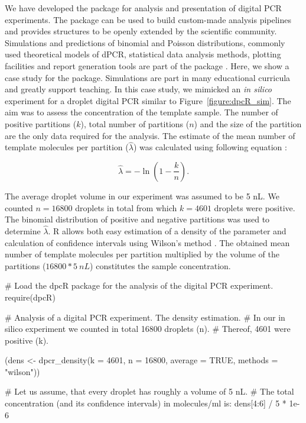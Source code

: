 We have developed the  package for analysis and presentation of 
digital PCR experiments. The  package can be used to build 
custom-made analysis pipelines and provides structures to be openly extended by 
the scientific community. Simulations and predictions of binomial and Poisson 
distributions, commonly used theoretical models of dPCR, statistical data 
analysis methods, plotting facilities and report generation tools are part of 
the package \citep{pabinger_2014}. Here, we show a case study for the 
 package. Simulations are part in many educational curricula and 
greatly support teaching. In this case study, we mimicked an \textit{in silico} 
experiment for a droplet digital PCR similar to Figure~\ref{figure:dpcR_sim}. 
The aim was to assess the concentration of the template sample. The number of 
positive partitions ($k$), total number of partitions ($n$) and the size of the 
partition are the only data required for the analysis. The estimate of the mean 
number of template molecules per partition ($\hat \lambda$) was calculated using 
following equation \citep{huggett_2013}:

\begin{equation}
\hat{\lambda} =  -\ln{(1 - \frac{k}{n})}.
\end{equation}

The average droplet volume in our experiment was assumed to be 5 nL. We counted 
$n = 16800$ droplets in total from which $k = 4601$ droplets were positive. The 
binomial distribution of positive and negative partitions was used to determine 
$\hat \lambda$. R allows both easy estimation of a density of the parameter and 
calculation of confidence intervals using Wilson's method \citep{brown_2001}. The 
obtained mean number of template molecules per partition multiplied by the 
volume of the partitions ($ 16800 * 5~nL$) constitutes the sample concentration.

\begin{example}
# Load the dpcR package for the analysis of the digital PCR experiment.
require(dpcR)

# Analysis of a digital PCR experiment. The density estimation.
# In our in silico experiment we counted in total 16800 droplets (n). 
# Thereof, 4601 were positive (k).

(dens <- dpcr_density(k = 4601, n = 16800, average = TRUE, methods = "wilson"))

# Let us assume, that every droplet has roughly a volume of 5 nL.
# The total concentration (and its confidence intervals) in molecules/ml is:
dens[4:6] / 5 * 1e-6
\end{example}

